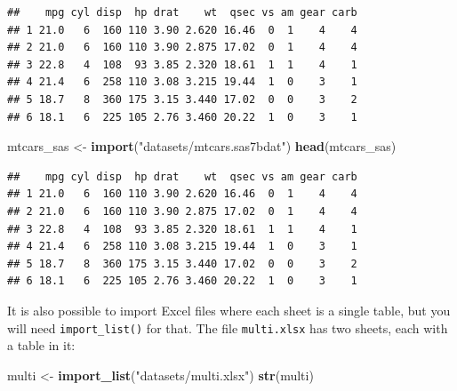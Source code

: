 \documentclass[]{gitbook}
\newenvironment{Shaded}{\begin{snugshade}}{\end{snugshade}}
\newcommand{\KeywordTok}[1]{\textcolor[rgb]{0.13,0.29,0.53}{\textbf{#1}}}
\newcommand{\NormalTok}[1]{#1}
\newcommand{\StringTok}[1]{\textcolor[rgb]{0.31,0.60,0.02}{#1}}
\begin{document}
\begin{verbatim}
##    mpg cyl disp  hp drat    wt  qsec vs am gear carb
## 1 21.0   6  160 110 3.90 2.620 16.46  0  1    4    4
## 2 21.0   6  160 110 3.90 2.875 17.02  0  1    4    4
## 3 22.8   4  108  93 3.85 2.320 18.61  1  1    4    1
## 4 21.4   6  258 110 3.08 3.215 19.44  1  0    3    1
## 5 18.7   8  360 175 3.15 3.440 17.02  0  0    3    2
## 6 18.1   6  225 105 2.76 3.460 20.22  1  0    3    1
\end{verbatim}

\begin{Shaded}
\begin{Highlighting}[]
\NormalTok{mtcars_sas <-}\StringTok{ }\KeywordTok{import}\NormalTok{(}\StringTok{"datasets/mtcars.sas7bdat"}\NormalTok{)}
\KeywordTok{head}\NormalTok{(mtcars_sas)}
\end{Highlighting}
\end{Shaded}

\begin{verbatim}
##    mpg cyl disp  hp drat    wt  qsec vs am gear carb
## 1 21.0   6  160 110 3.90 2.620 16.46  0  1    4    4
## 2 21.0   6  160 110 3.90 2.875 17.02  0  1    4    4
## 3 22.8   4  108  93 3.85 2.320 18.61  1  1    4    1
## 4 21.4   6  258 110 3.08 3.215 19.44  1  0    3    1
## 5 18.7   8  360 175 3.15 3.440 17.02  0  0    3    2
## 6 18.1   6  225 105 2.76 3.460 20.22  1  0    3    1
\end{verbatim}

It is also possible to import Excel files where each sheet is a single table, but you will need
\texttt{import\_list()} for that. The file \texttt{multi.xlsx} has two sheets, each with a table in it:

\begin{Shaded}
\begin{Highlighting}[]
\NormalTok{multi <-}\StringTok{ }\KeywordTok{import_list}\NormalTok{(}\StringTok{"datasets/multi.xlsx"}\NormalTok{)}
\KeywordTok{str}\NormalTok{(multi)}
\end{Highlighting}
\end{Shaded}
\end{document}
